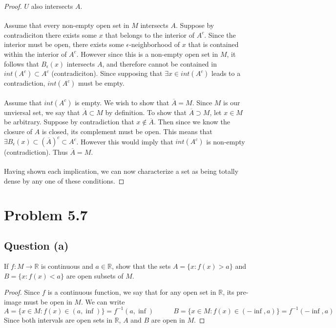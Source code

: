 \documentclass{article}
\begin{document}
\begin{proof}
        $U$ also intersects $A$.\\\\
         Assume that every non-empty open set in $M$ intersects $A$. Suppose by contradiciton
        there exists some $x$ that belongs to the interior of $A^c$. Since the interior must be open, there exists some
        $\epsilon$-neighborhood of $x$ that is contained within the interior of $A^c$. However since this is a non-empty
        open set in $M$, it follows that $B_\epsilon(x)$ intersects $A$, and therefore cannot be contained in $int(A^c) \subset A^c$ (contradiciton).
        Since supposing that $\exists x \in int(A^c)$ leads to a contradiction, $int(A^c)$ must be empty.
        \\\\
         Assume that $int(A^c)$ is empty. We wish to show that $\overline{A} = M$. Since $M$ is 
        our unviersal set, we say that $\overline{A} \subset M$ by definition. To show that $\overline{A} \supset M$, let $x \in M$
        be arbitrary. Suppose by contradiction that $x \notin \overline{A}$. Then since we know the closure of $A$ is closed, its complement must be open.
        This means that $\exists B_\epsilon(x) \subset \left(\overline{A}\right)^c \subset A^c$. However this would imply that 
        $int(A^c)$ is non-empty (contradiction). Thus $\overline{A} = M$.\\\\
        Having shown each implication, we can now characterize a set as being totally dense by any one of these conditions.
    \end{proof}
\section*{Problem 5.7}
    \subsection*{Question (a)}
        If $f:M \rightarrow \mathbb{R}$ is continuous and $a \in \mathbb{R}$, show that the sets $A = \{x : f(x) > a\}$
        and $B = \{x : f(x) < a\}$ are open subsets of $M$. 
        \begin{proof}
            Since $f$ is a continuous function, we say that for any open set in $\mathbb{R}$, its pre-image
            must be open in $M$. We can write
            \[
                A = \{x \in M : f(x) \in (a, \inf)\} = f^{-1}(a,\inf) \ \ \ \ \ \ \ \ \ \ \ \ \ B = \{x \in M : f(x) \in (-\inf, a)\} = f^{-1}(-\inf,a)
            \]
            Since both intervals are open sets in $\mathbb{R}$, $A$ and $B$ are open
            in $M$.
        \end{proof}
\end{document}
